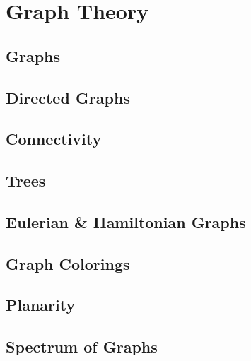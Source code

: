 
\part{Graph Theory}

\chapter{Graphs}
\chapter{Directed Graphs}
\chapter{Connectivity}
\chapter{Trees}
\chapter{Eulerian \& Hamiltonian Graphs}
\chapter{Graph Colorings}
\chapter{Planarity}
\chapter{Spectrum of Graphs}
